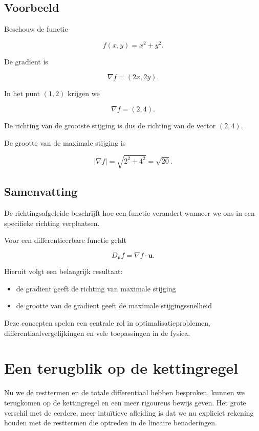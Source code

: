 \documentclass[11pt,a4paper]{article}
\begin{document}
    \subsection{Voorbeeld}

    Beschouw de functie

    \[
        f(x,y)=x^2+y^2.
    \]

    De gradient is

    \[
        \nabla f = (2x,2y).
    \]

    In het punt $(1,2)$ krijgen we

    \[
        \nabla f = (2,4).
    \]

    De richting van de grootste stijging is dus de richting van de vector $(2,4)$.

    De grootte van de maximale stijging is

    \[
        |\nabla f| = \sqrt{2^2+4^2} = \sqrt{20}.
    \]

    \subsection{Samenvatting}

    De richtingsafgeleide beschrijft hoe een functie verandert wanneer we ons
    in een specifieke richting verplaatsen.

    Voor een differentieerbare functie geldt

    \[
        D_{\mathbf{u}} f = \nabla f \cdot \mathbf{u}.
    \]

    Hieruit volgt een belangrijk resultaat:

    \begin{itemize}
        \item de gradient geeft de richting van maximale stijging
        \item de grootte van de gradient geeft de maximale stijgingssnelheid
    \end{itemize}

    Deze concepten spelen een centrale rol in optimalisatieproblemen,
    differentiaalvergelijkingen en vele toepassingen in de fysica.


    \section{Een terugblik op de kettingregel}

    Nu we de resttermen en de totale differentiaal hebben besproken, kunnen we
    terugkomen op de kettingregel en een meer rigoureus bewijs geven. Het grote
    verschil met de eerdere, meer intuïtieve afleiding is dat we nu expliciet
    rekening houden met de resttermen die optreden in de lineaire benaderingen.
\end{document}
